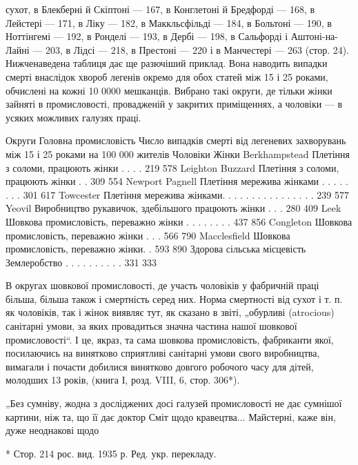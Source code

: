 \parcont{}  %
сухот, в Блекберні й Скіптоні — 167, в Конглетоні й Бредфорді —
168, в Лейстері — 171, в Ліку — 182, в Маккльсфільді — 184,
в Больтоні — 190, в Ноттінгемі — 192, в Ронделі — 193, в Дербі —
198, в Сальфорді і Аштоні-на-Лайні — 203, в Лідсі — 218, в Престоні — 220 і в Манчестері — 263
(стор. 24). Нижченаведена таблиця дає ще разючіший приклад. Вона наводить випадки смерті
внаслідок хвороб легенів окремо для обох статей між 15 і
25 роками, обчислені на кожні 10 0000 мешканців. Вибрано такі
округи, де тільки жінки зайняті в промисловості, провадженій
у закритих приміщеннях, а чоловіки — в усяких можливих галузях праці.

Округи    Головна промисловість    Число випадків смерті від легеневих захворувань між 15 і 25
роками на 100 000 жителів
        Чоловіки    Жінки
Berkhampstead    Плетіння з соломи, працюють жінки . . . .    219    578
Leighton Buzzard    Плетіння з соломи, працюють жінки . .     309    554
Newport Pagnell    Плетіння мережива жінками . . . . . . . .         301    617
Towcester    Плетіння мережива жінками. . . . . . . . . . . . . . . .    239    577
Yeovil    Виробництво рукавичок, здебільшого працюють жінки . . .  280    409
Leek    Шовкова промисловість, переважно жінки . . . . . . . .    437    856
Congleton    Шовкова промисловість, переважно жінки . . .    566    790
Macclesfield    Шовкова промисловість, переважно жінки. .    593    890
Здорова сільська місцевість    Землеробство . . . . . . . . . .         331    333

В округах шовкової промисловості, де участь чоловіків
у фабричній праці більша, більша також і смертність серед них.
Норма смертності від сухот і т. п. як чоловіків, так і жінок
виявляє тут, як сказано в звіті, „обурливі (atrocious) санітарні
умови, за яких провадиться значна частина нашої шовкової
промисловості“. І це, якраз, та сама шовкова промисловість,
фабриканти якої, посилаючись на винятково сприятливі санітарні умови свого виробництва, вимагали і
почасти добилися
винятково довгого робочого часу для дітей, молодших 13 років,
(книга І, розд. VIII, 6, стор. 306*).

„Без сумніву, жодна з досліджених досі галузей промисловості
не дає сумнішої картини, ніж та, що її дає доктор Сміт
щодо кравецтва... Майстерні, каже він, дуже неоднакові щодо

* Стор. 214 рос. вид. 1935 р. Ред. укр. перекладу.
\parbreak{}  %
